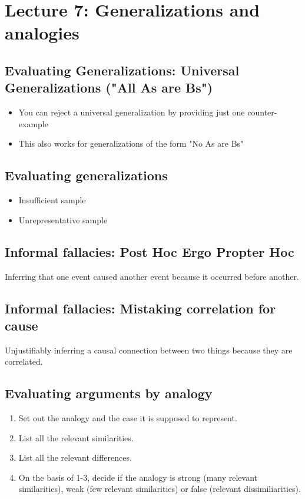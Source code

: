 \section{Lecture 7: Generalizations and analogies}

\subsection{Evaluating Generalizations: Universal
Generalizations ("All As are Bs")}

\begin{itemize}
    \item You can reject a universal generalization by providing
        just one counter-example
    \item This also works for generalizations of the form "No As
        are Bs"
\end{itemize}

\subsection{Evaluating generalizations}

\begin{itemize}
    \item Insufficient sample
    \item Unrepresentative sample
\end{itemize}

\subsection{Informal fallacies: Post Hoc Ergo Propter Hoc}

Inferring that one event caused another event because it occurred
before another.

\subsection{Informal fallacies: Mistaking correlation for cause}

Unjustifiably inferring a causal connection between two things because they
are correlated.

\subsection{Evaluating arguments by analogy}

\begin{enumerate}
    \item Set out the analogy and the case it is supposed to represent.
    \item List all the relevant similarities.
    \item List all the relevant differences.
    \item On the basis of 1-3, decide if the analogy is strong
        (many relevant similarities), weak (few relevant similarities)
        or false (relevant dissimiliarities).
\end{enumerate}